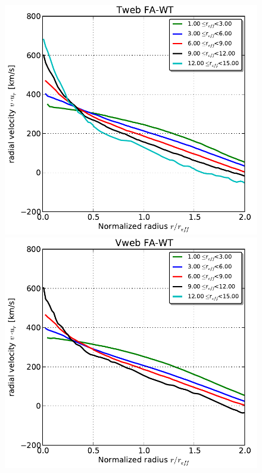 \documentclass[a4,useAMS,usenatbib,usegraphicx]{latex/mn2e}
\begin{document}
\begin{flushleft}
\begin{figure}
  \includegraphics[trim = 1mm 2mm 4mm 0mm, clip, keepaspectratio=true,
  width=0.24\textheight]{./figures/voids_velocity_TwebFAG.pdf}
  \includegraphics[trim = 1mm 2mm 4mm 0mm, clip, keepaspectratio=true,
  width=0.24\textheight]{./figures/voids_velocity_VwebFAG.pdf}

\end{figure}
\end{flushleft}
\end{document}
